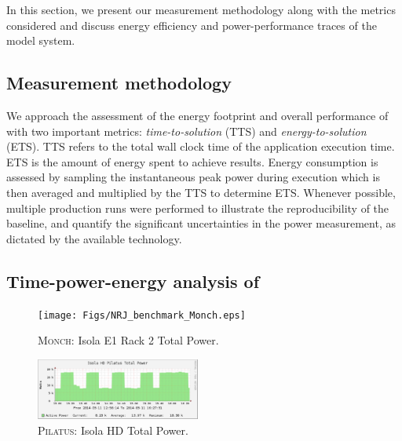 In this section, we present our measurement methodology along with the
metrics considered and discuss energy efficiency and power-performance
traces of the model system.

\subsection{Measurement methodology}
\label{subsec:4.1}

We  approach  the  assessment  of  the energy  footprint  and  overall
performance   of   \cosmoart   with  two   important  metrics:
\textit{time-to-solution} (TTS) and \textit{energy-to-solution} (ETS).
TTS refers to  the total wall clock time  of the application execution
time. ETS  is the amount of  energy spent to  achieve results.  Energy
consumption  is  assessed by  sampling  the  instantaneous peak  power
during execution which  is then averaged and multiplied  by the TTS to
determine  ETS.   Whenever  possible,  multiple production  runs  were
performed  to  illustrate the  reproducibility  of  the baseline,  and
quantify the  significant uncertainties  in the power  measurement, as
dictated by the available technology.

\subsection{Time-power-energy analysis of \cosmoart}
\label{subsec:4.2}

\begin{figure}[htbf]
  \begin{center}
    \texttt{[image: Figs/NRJ\_benchmark\_Monch.eps]}
    \caption{\textsc{Monch}: Isola E1 Rack 2 Total Power.}
    \label{fig:1}
  \end{center}
\end{figure}

\begin{figure}[htbf]
  \begin{center}
    \includegraphics[width=0.48\textwidth]{Figs/NRJ_benchmark_Pilatus.eps}
    \caption{\textsc{Pilatus}: Isola HD Total Power.}
    \label{fig:2}
  \end{center}
\end{figure}

